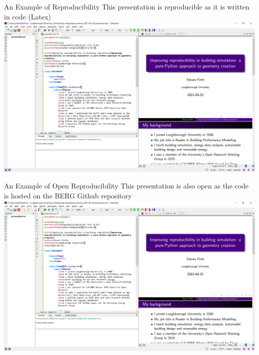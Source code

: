 \documentclass{beamer}
\begin{document}
	\begin{frame}{An Example of Reproducibility}
		This presentation is reproducible as it is written in code (Latex)\\[10pt]
		\includegraphics[width=\textwidth,keepaspectratio]{latex_example.png}
	\end{frame}
	
	\begin{frame}{An Example of Open Reproducibility}
		This presentation is also open as the code is hosted on the BERG Github repository\\[10pt]
		\includegraphics[width=\textwidth,keepaspectratio]{latex_example.png}
	\end{frame}
	
\end{document}
